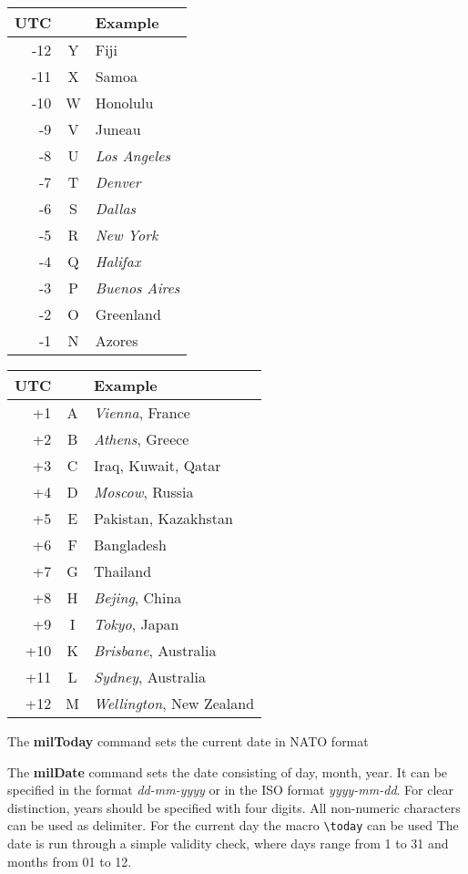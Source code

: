 \documentclass[a4paper,10pt]{scrarticle}
\begin{document}
\bigskip\begin{minipage}{0.4\textwidth}\label{tab:timezones}
\begin{tabular}{rcl}
\toprule
UTC & & Example \\
\midrule
-12 & Y & Fiji \\
-11 & X & Samoa \\
-10 & W & Honolulu \\
-9 & V & Juneau \\
-8 & U & \emph{Los Angeles} \\
-7 & T & \emph{Denver} \\
-6 & S & \emph{Dallas} \\
-5 & R & \emph{New York} \\
-4 & Q & \emph{Halifax} \\
-3 & P & \emph{Buenos Aires} \\
-2 & O & Greenland \\
-1 & N & Azores \\
\bottomrule
\end{tabular}
\end{minipage}
\begin{minipage}{0.4\textwidth}
\begin{tabular}{rcl}
\toprule
UTC & & Example \\
\midrule
+1 & A & \emph{Vienna}, France \\
+2 & B & \emph{Athens}, Greece\\
+3 & C & Iraq, Kuwait, Qatar\\
+4 & D & \emph{Moscow}, Russia\\
+5 & E & Pakistan, Kazakhstan\\
+6 & F & Bangladesh \\
+7 & G & Thailand \\
+8 & H & \emph{Bejing}, China \\
+9 & I & \emph{Tokyo}, Japan \\
+10 & K & \emph{Brisbane}, Australia \\
+11 & L & \emph{Sydney}, Australia \\
+12 & M & \emph{Wellington}, New Zealand \\
\bottomrule
\end{tabular}
\end{minipage}

\bigskip\noindent{} The \textbf{milToday} command sets the current date in NATO format

\noindent{} The \textbf{milDate} command sets the date consisting of day, month, year. It can be specified in the format \emph{dd-mm-yyyy} or in the ISO format \emph{yyyy-mm-dd}. For clear distinction, years should be specified with four digits. All non-numeric characters can be used as delimiter. For the current day the macro \verb+\today+ can be used
The date is run through a simple validity check, where days range from 1 to 31 and months from 01 to 12.
\end{document}
